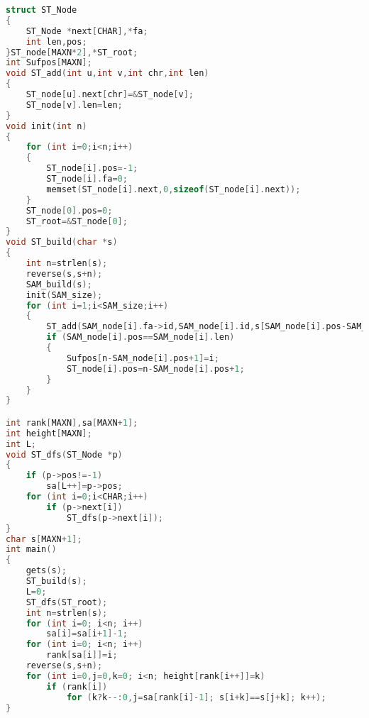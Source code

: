 \begin{lstlisting}[language=c++]
struct ST_Node
{
    ST_Node *next[CHAR],*fa;
    int len,pos;
}ST_node[MAXN*2],*ST_root;
int Sufpos[MAXN];
void ST_add(int u,int v,int chr,int len)
{
    ST_node[u].next[chr]=&ST_node[v];
    ST_node[v].len=len;
}
void init(int n)
{
    for (int i=0;i<n;i++)
    {
        ST_node[i].pos=-1;
        ST_node[i].fa=0;
        memset(ST_node[i].next,0,sizeof(ST_node[i].next));
    }
    ST_node[0].pos=0;
    ST_root=&ST_node[0];
}
void ST_build(char *s)
{
    int n=strlen(s);
    reverse(s,s+n);
    SAM_build(s);
    init(SAM_size);
    for (int i=1;i<SAM_size;i++)
    {
        ST_add(SAM_node[i].fa->id,SAM_node[i].id,s[SAM_node[i].pos-SAM_node[i].fa->len-1]-'a',SAM_node[i].len-SAM_node[i].fa->len);
        if (SAM_node[i].pos==SAM_node[i].len)
        {
            Sufpos[n-SAM_node[i].pos+1]=i;
            ST_node[i].pos=n-SAM_node[i].pos+1;
        }
    }
}

int rank[MAXN],sa[MAXN+1];
int height[MAXN];
int L;
void ST_dfs(ST_Node *p)
{
    if (p->pos!=-1)
        sa[L++]=p->pos;
    for (int i=0;i<CHAR;i++)
        if (p->next[i])
            ST_dfs(p->next[i]);
}
char s[MAXN+1];
int main()
{
    gets(s);
    ST_build(s);
    L=0;
    ST_dfs(ST_root);
    int n=strlen(s);
    for (int i=0; i<n; i++)
        sa[i]=sa[i+1]-1;
    for (int i=0; i<n; i++)
        rank[sa[i]]=i;
    reverse(s,s+n);
    for (int i=0,j=0,k=0; i<n; height[rank[i++]]=k)
        if (rank[i])
            for (k?k--:0,j=sa[rank[i]-1]; s[i+k]==s[j+k]; k++);
}
    \end{lstlisting} 
    
